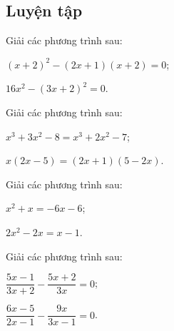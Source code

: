 \begin{practice}
    \subsection{Luyện tập}

    \begin{questions}[series=SBT]
        \item Giải các phương trình sau:
        \begin{questions}
            \item $(x+2)^2-(2x+1)(x+2)=0$;

            \answerline
            \answerline
            \item $16x^2-(3x+2)^2=0$.

            \answerline
            \answerline
        \end{questions}

        \item Giải các phương trình sau:
        \begin{questions}
            \item $x^3+3x^2-8=x^3+2x^2-7$;

            \answerline
            \answerline
            \item $x(2x-5)=(2x+1)(5-2x)$.

            \answerline
            \answerline
        \end{questions}

        \item Giải các phương trình sau:
        \begin{questions}
            \item $x^2+x=-6x-6$;

            \answerline
            \answerline
            \item $2x^2-2x=x-1$.

            \answerline
            \answerline
        \end{questions}

        \item Giải các phương trình sau:
        \begin{questions}
            \item $\dfrac{5x-1}{3x+2}-\dfrac{5x+2}{3x}=0$;

            \answerline
            \answerline
            \answerline
            \item $\dfrac{6x-5}{2x-1}-\dfrac{9x}{3x-1}=0$.


\end{questions}
\end{questions}
\end{practice}

